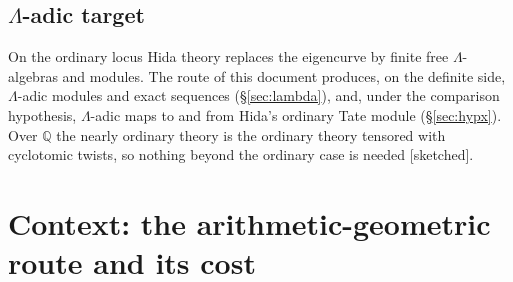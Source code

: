 \documentclass[11pt]{amsart}
\theoremstyle{plain}
\theoremstyle{definition}
\theoremstyle{remark}
\newcommand{\status}[1]{\textup{\textsf{[#1]}}}
\newcommand{\stsketch}{\status{sketched}}
\newcommand{\Q}{\mathbb{Q}}\newcommand{\Z}{\mathbb{Z}}\newcommand{\R}{\mathbb{R}}\newcommand{\C}{\mathbb{C}}
\begin{document}
\subsection{$\Lambda$-adic target}
On the ordinary locus Hida theory replaces the eigencurve by finite free $\Lambda$-algebras and modules. The route of this document produces, on the definite side, $\Lambda$-adic modules and exact sequences (\S\ref{sec:lambda}), and, under the comparison hypothesis, $\Lambda$-adic maps to and from Hida's ordinary Tate module (\S\ref{sec:hypx}).
Over $\Q$ the nearly ordinary theory is the ordinary theory tensored with cyclotomic twists, so nothing beyond the ordinary case is needed \stsketch.

\section{Context: the arithmetic-geometric route and its cost}\label{sec:geom}
\end{document}
